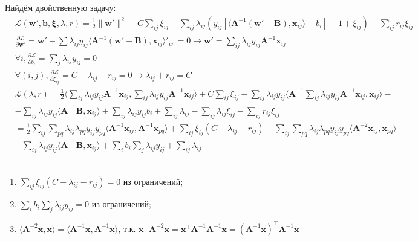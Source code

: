 \documentclass[12pt,twoside]{article}
\begin{document}
Найдём двойственную задачу:
\begin{equation}
\begin{aligned}
& \mathcal{L}(\mathbf{w}', \mathbf{b}, \mathbf{\xi}, \lambda, r) = \frac{1}{2} \|\mathbf{w}'\|^2 + C\sum\limits_{ij}\xi_{ij} - 
\sum_{ij}{\lambda_{ij} \left( y_{ij}[\langle \mathbf{A}^{-1}\left(\mathbf{w}'+\mathbf{B}\right), \mathbf{x}_{ij}\rangle - b_i]-1+\xi_{ij} \right)} -
\sum_{ij}{r_{ij}\xi_{ij}} \\
& \frac{\partial{\mathcal{L}}}{\partial{\mathbf{w}'}} = \mathbf{w}' - \sum{\lambda_{ij}y_{ij}\langle \mathbf{A}^{-1}\left(\mathbf{w}'+\mathbf{B}\right), \mathbf{x}_{ij} \rangle}'_{w'} = 0 \rightarrow \mathbf{w}' = \sum_{ij}{\lambda_{ij}y_{ij}\mathbf{A}^{-1} \mathbf{x}_{ij}} \\
& \forall i, 
\frac{\partial{\mathcal{L}}}{\partial{b_i}} = \sum_j{\lambda_{ij}y_{ij}} = 0 \\
& \forall (i, j), \frac{\partial{\mathcal{L}}}{\partial{\xi_{ij}}} = C - \lambda_{ij} - r_{ij} = 0 \rightarrow \lambda_{ij} + r_{ij} = C
\end{aligned}
\end{equation}
\begin{equation}
\begin{aligned}
& \mathcal{L}(\lambda, r) = \frac{1}{2} \langle \sum_{ij}{\lambda_{ij}y_{ij}\mathbf{A}^{-1} \mathbf{x}_{ij}}, \sum_{ij}{\lambda_{ij}y_{ij}\mathbf{A}^{-1} \mathbf{x}_{ij}} \rangle + C\sum\limits_{ij}\xi_{ij} - 
\sum_{ij}{\lambda_{ij} y_{ij}\langle \mathbf{A}^{-1} \sum_{ij}{\lambda_{ij}y_{ij} \mathbf{A}^{-1}  \mathbf{x}_{ij}}, \mathbf{x}_{ij}\rangle} - \\ 
& - \sum_{ij}{\lambda_{ij} y_{ij}\langle \mathbf{A}^{-1}\mathbf{B}, \mathbf{x}_{ij} \rangle} + \sum_{ij}{\lambda_{ij} y_{ij}b_i} + \sum_{ij}{\lambda_{ij}}  - \sum_{ij}{\lambda_{ij}\xi_{ij}}- \sum_{ij}{r_{ij}\xi_{ij}} = \\
& = \frac{1}{2} \sum_{ij}\sum_{pq} {\lambda_{ij}\lambda_{pq}y_{ij}y_{pq}\langle \mathbf{A}^{-1} \mathbf{x}_{ij}, \mathbf{A}^{-1} \mathbf{x}_{pq} \rangle} + \sum_{ij}{\xi_{ij}(C - \lambda_{ij} - r_{ij})} - \sum_{ij}\sum_{pq} {\lambda_{ij}\lambda_{pq}y_{ij}y_{pq}\langle \mathbf{A}^{-2} \mathbf{x}_{ij},  \mathbf{x}_{pq} \rangle} - \\
& - \sum_{ij}{\lambda_{ij} y_{ij}\langle \mathbf{A}^{-1}\mathbf{B}, \mathbf{x}_{ij} \rangle} + \sum_{i}{b_i \sum_j{\lambda_{ij} y_{ij}}} + \sum_{ij}{\lambda_{ij}}
\end{aligned}
\end{equation}
\\
\begin{enumerate}
	\item $\sum_{ij}{\xi_{ij}(C - \lambda_{ij} - r_{ij})} = 0$ из ограничений;
	\item $\sum_{i}{b_i \sum_j{\lambda_{ij} y_{ij}}} = 0$ из ограничений;
	\item $\langle  \mathbf{A}^{-2} \mathbf{x},  \mathbf{x} \rangle = \langle  \mathbf{A}^{-1} \mathbf{x}, \mathbf{A}^{-1} \mathbf{x} \rangle$, т.к. $\mathbf{x}^{\top}\mathbf{A}^{-2} \mathbf{x} =  \mathbf{x}^{\top}\mathbf{A}^{-1}\mathbf{A}^{-1} \mathbf{x} = (\mathbf{A}^{-1} \mathbf{x})^{\top}\mathbf{A}^{-1} \mathbf{x}$
\end{enumerate}
\end{document}
